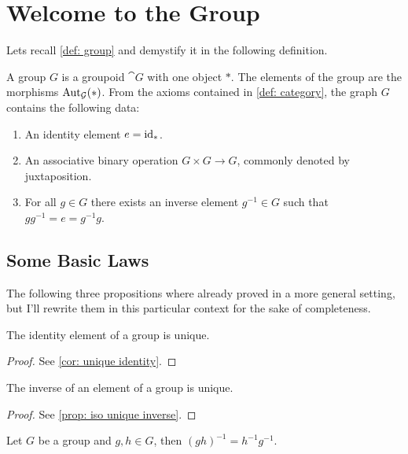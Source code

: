 \section{Welcome to the Group}

Lets recall \cref{def: group} and demystify it in the following definition.

\begin{definition}[Group]
A group \(G\) is a groupoid \(\cat G\) with one object \(*\). The elements of
the group are the morphisms \(\operatorname{Aut}_{\mathcal G}(*)\). From the axioms contained in
\cref{def: category}, the graph \(G\) contains the following data:
\begin{enumerate}[(G1)]
  \item An identity element \(e = \operatorname{id}_*\).
  \item An associative binary operation \(G \times G \to G\), commonly denoted
    by juxtaposition.
  \item For all \(g \in G\) there exists an inverse element \(g^{-1} \in G\)
    such that \(g g^{-1} = e = g^{-1} g\).
\end{enumerate}
\end{definition}

\subsection{Some Basic Laws}

The following three propositions where already proved in a more general setting,
but I'll rewrite them in this particular context for the sake of completeness.

\begin{proposition}
The identity element of a group is unique.
\end{proposition}

\begin{proof}
See \cref{cor: unique identity}.
\end{proof}

\begin{proposition}
The inverse of an element of a group is unique.
\end{proposition}

\begin{proof}
See \cref{prop: iso unique inverse}.
\end{proof}

\begin{proposition}
Let \(G\) be a group and \(g, h \in G\), then \((g h)^{-1} = h^{-1} g^{-1}\).
\end{proposition}

